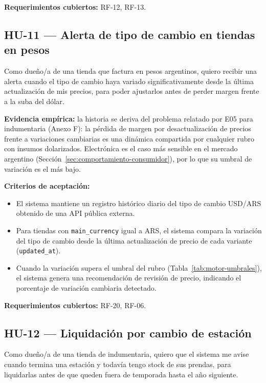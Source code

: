 \noindent\textbf{Requerimientos cubiertos:} RF-12, RF-13.

\subsection{HU-11 --- Alerta de tipo de cambio en tiendas en pesos}
\label{sec:hu-11}

Como dueño/a de una tienda que factura en pesos argentinos, quiero recibir una alerta cuando el tipo de cambio haya variado significativamente desde la última actualización de mis precios, para poder ajustarlos antes de perder margen frente a la suba del dólar.

\noindent\textbf{Evidencia empírica:} la historia se deriva del problema relatado por E05 para indumentaria (Anexo F): la pérdida de margen por desactualización de precios frente a variaciones cambiarias es una dinámica compartida por cualquier rubro con insumos dolarizados. Electrónica es el caso más sensible en el mercado argentino (Sección~\ref{sec:comportamiento-consumidor}), por lo que su umbral de variación es el más bajo.

\noindent\textbf{Criterios de aceptación:}
\begin{itemize}
    \item El sistema mantiene un registro histórico diario del tipo de cambio USD/ARS obtenido de una API pública externa.
    \item Para tiendas con \texttt{main\_currency} igual a ARS, el sistema compara la variación del tipo de cambio desde la última actualización de precio de cada variante (\texttt{updated\_at}).
    \item Cuando la variación supera el umbral del rubro (Tabla~\ref{tab:motor-umbrales}), el sistema genera una recomendación de revisión de precio, indicando el porcentaje de variación cambiaria detectado.
\end{itemize}

\noindent\textbf{Requerimientos cubiertos:} RF-20, RF-06.

\subsection{HU-12 --- Liquidación por cambio de estación}
\label{sec:hu-12}

Como dueño/a de una tienda de indumentaria, quiero que el sistema me avise cuando termina una estación y todavía tengo stock de sus prendas, para liquidarlas antes de que queden fuera de temporada hasta el año siguiente.

